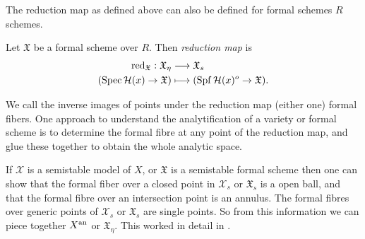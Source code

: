 The reduction map as defined above can also be defined for formal schemes $R$ schemes.  
\begin{definition}
	Let $\mathfrak{X} $ be a formal scheme over $R$. 
	Then \emph{reduction map} is 
	\begin{align*}
		\operatorname{red}_{\mathfrak X}:  \mathfrak{X} _\eta &\longrightarrow \mathfrak{X} _s \\
		(\operatorname{Spec} \mathcal H(x) \to \mathfrak X) &\longmapsto (\operatorname{Spf} \mathcal H(x)^o \to \mathfrak X)
	.\end{align*}
\end{definition}

We call the inverse images of points under the reduction map (either one) formal fibers. 
One approach to understand the analytification of a variety or formal scheme is to determine the formal fibre at any point of the reduction map, and glue these together to obtain the whole analytic space. 

If $\mathscr X$ is a semistable model of $X$, or $\mathfrak{X} $ is a semistable formal scheme then one can show that the formal fiber over a closed point in $\mathscr X_s$ or $\mathfrak{X} _s$ is a open ball, and that the formal fibre over an intersection point is an annulus. 
The formal fibres over generic points of $\mathscr X_s$ or $\mathfrak{X} _s$ are single points. 
So from this information we can piece together $X{}^{\text{an}}$ or  $\mathfrak{X} _\eta$. 
This worked in detail in \cite{bakerStructureNonarchimedeanAnalytic2013}.



